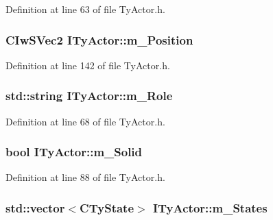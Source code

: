 Definition at line 63 of file TyActor.h.

\hypertarget{class_i_ty_actor_a296ffe4ccf5fad06daf002837b9ec128}{
\subsubsection[{m\_\-Position}]{\setlength{\rightskip}{0pt plus 5cm}CIwSVec2 {\bf ITyActor::m\_\-Position}}}
\label{class_i_ty_actor_a296ffe4ccf5fad06daf002837b9ec128}


Definition at line 142 of file TyActor.h.

\hypertarget{class_i_ty_actor_a92de9e18b7a31fc93b8bb775922078d4}{
\subsubsection[{m\_\-Role}]{\setlength{\rightskip}{0pt plus 5cm}std::string {\bf ITyActor::m\_\-Role}}}
\label{class_i_ty_actor_a92de9e18b7a31fc93b8bb775922078d4}


Definition at line 68 of file TyActor.h.

\hypertarget{class_i_ty_actor_a0365728019201a011e657ab56e36d06a}{
\subsubsection[{m\_\-Solid}]{\setlength{\rightskip}{0pt plus 5cm}bool {\bf ITyActor::m\_\-Solid}}}
\label{class_i_ty_actor_a0365728019201a011e657ab56e36d06a}


Definition at line 88 of file TyActor.h.

\hypertarget{class_i_ty_actor_aa90c7ebf0af50802126ca951906fb225}{
\subsubsection[{m\_\-States}]{\setlength{\rightskip}{0pt plus 5cm}std::vector$<${\bf CTyState}$>$ {\bf ITyActor::m\_\-States}}}
\label{class_i_ty_actor_aa90c7ebf0af50802126ca951906fb225}


